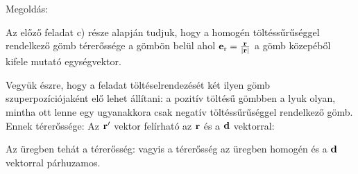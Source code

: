 
\ifdefined\megoldas

 Megoldás: 

 Az előző feladat c) része alapján tudjuk, hogy a homogén töltéssűrűséggel  rendelkező gömb térerőssége a gömbön belül
 ahol $\mathbf{e}_\text{r}=\frac{\mathbf{r}}{\left\lvert\mathbf{r}\right\rvert}$ a gömb közepéből kifele mutató egységvektor. 

 Vegyük észre, hogy a feladat töltéselrendezését két ilyen gömb szuperpozíciójaként elő lehet állítani: a pozitív töltésű gömbben a lyuk olyan, mintha ott lenne egy ugyanakkora csak negatív töltéssűrűséggel rendelkező gömb. Ennek térerőssége:
 Az $\mathbf{r}'$ vektor felírható az $\mathbf{r}$ és a $\mathbf{d}$ vektorral:

 Az üregben tehát a térerősség:
 vagyis a térerősség az üregben homogén és a $\mathbf{d}$ vektorral párhuzamos.

\fi